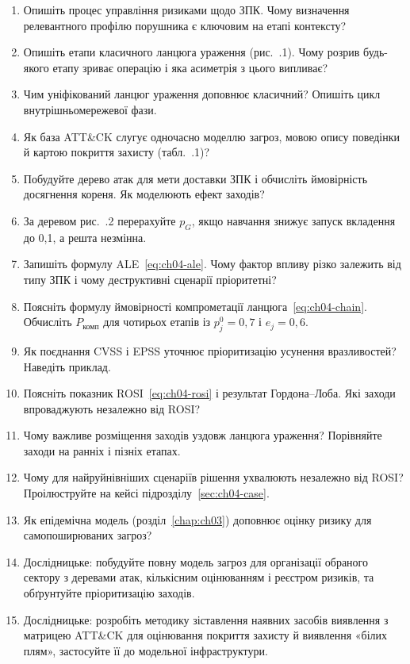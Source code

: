 \selfcheck
\begin{enumerate}
\item Опишіть процес управління ризиками щодо ЗПК. Чому визначення релевантного профілю порушника є ключовим на етапі контексту?
\item Опишіть етапи класичного ланцюга ураження (рис.~\thechapter.1). Чому розрив будь-якого етапу зриває операцію і яка асиметрія з цього випливає?
\item Чим уніфікований ланцюг ураження доповнює класичний? Опишіть цикл внутрішньомережевої фази.
\item Як база ATT\&CK слугує одночасно моделлю загроз, мовою опису поведінки й картою покриття захисту (табл.~\thechapter.1)?
\item Побудуйте дерево атак для мети доставки ЗПК і обчисліть ймовірність досягнення кореня. Як моделюють ефект заходів?
\item За деревом рис.~\thechapter.2 перерахуйте $p_G$, якщо навчання знижує запуск вкладення до 0,1, а решта незмінна.
\item Запишіть формулу ALE~\eqref{eq:ch04-ale}. Чому фактор впливу різко залежить від типу ЗПК і чому деструктивні сценарії пріоритетні?
\item Поясніть формулу ймовірності компрометації ланцюга~\eqref{eq:ch04-chain}. Обчисліть $P_{\text{комп}}$ для чотирьох етапів із $p_j^0=0{,}7$ і $e_j=0{,}6$.
\item Як поєднання CVSS і EPSS уточнює пріоритизацію усунення вразливостей? Наведіть приклад.
\item Поясніть показник ROSI~\eqref{eq:ch04-rosi} і результат Гордона--Лоба. Які заходи впроваджують незалежно від ROSI?
\item Чому важливе розміщення заходів уздовж ланцюга ураження? Порівняйте заходи на ранніх і пізніх етапах.
\item Чому для найруйнівніших сценаріїв рішення ухвалюють незалежно від ROSI? Проілюструйте на кейсі підрозділу~\ref{sec:ch04-case}.
\item Як епідемічна модель (розділ~\ref{chap:ch03}) доповнює оцінку ризику для самопоширюваних загроз?
\item Дослідницьке: побудуйте повну модель загроз для організації обраного сектору з деревами атак, кількісним оцінюванням і реєстром ризиків, та обґрунтуйте пріоритизацію заходів.
\item Дослідницьке: розробіть методику зіставлення наявних засобів виявлення з матрицею ATT\&CK для оцінювання покриття захисту й виявлення «білих плям», застосуйте її до модельної інфраструктури.
\end{enumerate}
